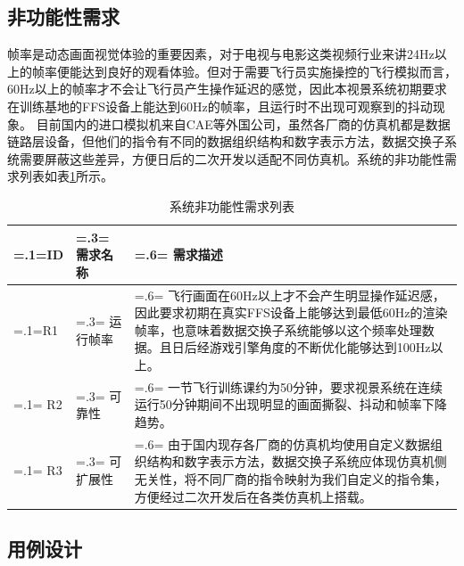 \subsection{非功能性需求}
帧率是动态画面视觉体验的重要因素，对于电视与电影这类视频行业来讲24Hz以上的帧率便能达到良好的观看体验\cite{frame}。但对于需要飞行员实施操控的飞行模拟而言，60Hz以上的帧率才不会让飞行员产生操作延迟的感觉，因此本视景系统初期要求在训练基地的FFS设备上能达到60Hz的帧率，且运行时不出现可观察到的抖动现象。
目前国内的进口模拟机来自CAE等外国公司，虽然各厂商的仿真机都是数据链路层设备，但他们的指令有不同的数据组织结构和数字表示方法，数据交换子系统需要屏蔽这些差异，方便日后的二次开发以适配不同仿真机。系统的非功能性需求列表如表\ref{unfuncreq}所示。
\begin{table}[h!]
    \begin{center}
        \caption{系统非功能性需求列表}
        \label{unfuncreq}
        \renewcommand\arraystretch{1.5}
        \begin{tabularx}{\textwidth}{ 
            | >{\centering\arraybackslash\hsize=.1\hsize\linewidth=\hsize}X 
            | >{\centering\arraybackslash\hsize=.3\hsize\linewidth=\hsize}X 
            | >{\raggedright\arraybackslash\hsize=.6\hsize\linewidth=\hsize}X 
            | }
            \hline
            \textbf{ID} & \textbf{需求名称} & \textbf{需求描述}\\
            \hline
            R1 & 运行帧率 & 飞行画面在60Hz以上才不会产生明显操作延迟感，因此要求初期在真实FFS设备上能够达到最低60Hz的渲染帧率，也意味着数据交换子系统能够以这个频率处理数据。且日后经游戏引擎角度的不断优化能够达到100Hz以上。\\
            \hline
            R2 & 可靠性 & 一节飞行训练课约为50分钟，要求视景系统在连续运行50分钟期间不出现明显的画面撕裂、抖动和帧率下降趋势。\\
            \hline
            R3 & 可扩展性 & 由于国内现存各厂商的仿真机均使用自定义数据组织结构和数字表示方法，数据交换子系统应体现仿真机侧无关性，将不同厂商的指令映射为我们自定义的指令集，方便经过二次开发后在各类仿真机上搭载。\\
            \hline
        \end{tabularx}
    \end{center}
\end{table}

\subsection{用例设计}

